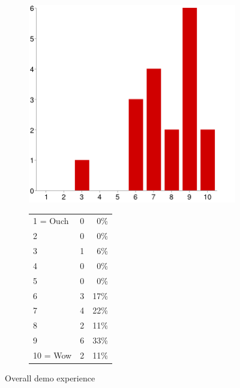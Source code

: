 \documentclass[MSc,paper=a4,pagesize=auto]{icldt}
\begin{document}
\begin{figure}[htbp!]
\centering
\begin{subfigure}{0.4\textwidth}
    \centering
    \includegraphics[width=1\linewidth]{resources/9-overall_experience}
\end{subfigure}%
\centering
\begin{subfigure}{\textwidth}
    \centering
   	\begin{tabular}{ l c r }
1 = Ouch&0&0\% \\
2&0&0\% \\
3&1&6\% \\
4&0&0\% \\
5&0&0\% \\
6&3&17\% \\
7&4&22\% \\
8&2&11\% \\
9&6&33\% \\
10 = Wow&2&11\% \\

\end{tabular}
\end{subfigure} 
    \caption{Overall demo experience}
    \label{fig:9-overall_experience}
\end{figure}

\end{document}
